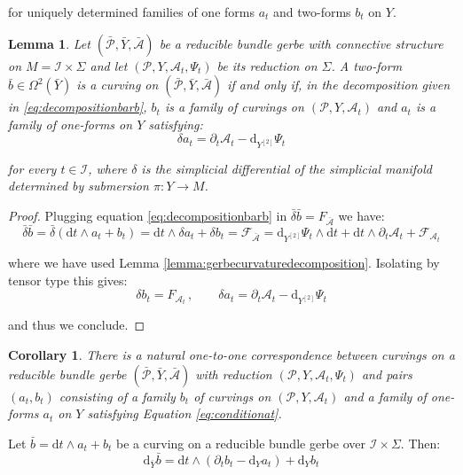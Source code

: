 \documentclass[10pt,reqno,a4paper]{amsart}
\theoremstyle{plain}
\newtheorem{lemma}[thm]{Lemma}
\newtheorem{cor}[thm]{Corollary}
\theoremstyle{definition}
\theoremstyle{remark}
\theoremstyle{remark}
\def\dd{\mathrm{d}}
\def\cA{\mathcal{A}}
\def\cI{\mathcal{I}}
\def\cP{\mathcal{P}}
\def\cF{\mathcal{F}}
\renewcommand{\(}{ (}
\renewcommand{\)}{ )}
\begin{document}
\noindent
for uniquely determined families of one forms $a_t$ and two-forms $b_t$ on $Y$.
\begin{lemma}
\label{lemma:reduciblegerbe}
Let $(\bar{\cP},\bar{Y},\bar{\cA})$ be a reducible bundle gerbe with connective structure on $M = \cI \times \Sigma$ and let  $(\cP,Y, \cA_t, \Psi_t)$ be its reduction on $\Sigma$. A two-form $\bar{b}\in \Omega^2(\bar{Y})$ is a curving on $(\bar{\cP},\bar{Y},\bar{\cA})$ if and only if, in the decomposition given in \eqref{eq:decompositionbarb}, $b_t$ is a family of curvings on $(\cP,Y,\cA_t)$ and $a_t$ is a family of one-forms on $Y$ satisfying:
\begin{equation}
\label{eq:conditionat}
\delta a_t = \partial_t \cA_t - \dd_{Y^{[2]}} \Psi_t
\end{equation}

\noindent
for every $t\in \cI$, where $\delta$ is the simplicial differential of the simplicial manifold determined by submersion $\pi \colon Y \to M$.
\end{lemma}


\begin{proof}
Plugging equation \eqref{eq:decompositionbarb} in $\bar{\delta} \bar{b} = F_{\bar{\cA}}$ we have:
\begin{equation*}
\bar{\delta}\bar{b} = \bar{\delta}(\dd t \wedge a_t + b_t) = \dd t \wedge \delta a_t + \delta b_t = \cF_{\bar{\cA}} = \dd_{Y^{[2]}} \Psi_t \wedge \dd t + \dd t \wedge \partial_t \cA_t + \cF_{\cA_t}
\end{equation*}

\noindent
where we have used Lemma \ref{lemma:gerbecurvaturedecomposition}. Isolating by tensor type this gives:
\begin{equation*}
\delta b_t = F_{\cA_t}\, , \qquad \delta a_t = \partial_t \cA_t - \dd_{Y^{[2]}} \Psi_t
\end{equation*}

\noindent
and thus we conclude. 
\end{proof}

\begin{cor}
There is a natural one-to-one correspondence between curvings on a reducible bundle gerbe $(\bar{\cP},\bar{Y},\bar{\cA})$ with reduction $(\cP,Y,\cA_t,\Psi_t)$ and pairs $(a_t,b_t)$ consisting of a family $b_t$ of curvings on $(\cP,Y,\cA_t)$ and a family of one-forms $a_t$ on $Y$ satisfying Equation \eqref{eq:conditionat}.
\end{cor}

\noindent
Let $\bar{b} = \dd t \wedge a_t + b_t$ be a curving on a reducible bundle gerbe over $\cI\times \Sigma$. Then:
\begin{equation*}
\dd_{\bar{Y}}\bar{b} = \dd t \wedge (\partial_t b_t - \dd_Y a_t) + \dd_Y b_t
\end{equation*}
\end{document}
